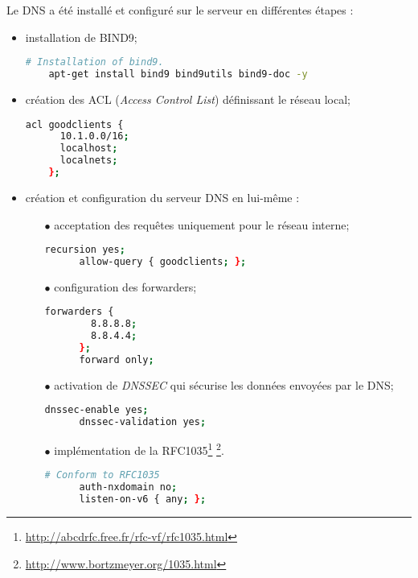 Le DNS a été installé et configuré sur le serveur en différentes étapes :
\begin{itemize}
\item installation de BIND9;

  \begin{lstlisting}[language=bash]
    # Installation of bind9.
    apt-get install bind9 bind9utils bind9-doc -y
  \end{lstlisting}

\item création des ACL (\emph{Access Control List}) définissant le réseau local;

  \begin{lstlisting}[language=bash]
    acl goodclients {
      10.1.0.0/16;
      localhost;
      localnets;
    };
  \end{lstlisting}

  \newpage

\item création et configuration du serveur DNS en lui-même :
  \begin{itemize}
  \item[\tiny$\bullet$] acceptation des requêtes uniquement pour le réseau
    interne;

    \begin{lstlisting}[language=bash]
      recursion yes;
      allow-query { goodclients; };
    \end{lstlisting}

  \item[\tiny$\bullet$] configuration des forwarders;

    \begin{lstlisting}[language=bash]
      forwarders {
        8.8.8.8;
        8.8.4.4;
      };
      forward only;
    \end{lstlisting}

  \item[\tiny$\bullet$] activation de \emph{DNSSEC} qui sécurise les
    données envoyées par le DNS;

    \begin{lstlisting}[language=bash]
      dnssec-enable yes;
      dnssec-validation yes;
    \end{lstlisting}

  \item[\tiny$\bullet$] implémentation de la
    RFC1035\footnote{\url{http://abcdrfc.free.fr/rfc-vf/rfc1035.html}}
    \footnote{\url{http://www.bortzmeyer.org/1035.html}}.

    \begin{lstlisting}[language=bash]
      # Conform to RFC1035
      auth-nxdomain no;
      listen-on-v6 { any; };
    \end{lstlisting}
  \end{itemize}
\end{itemize}

